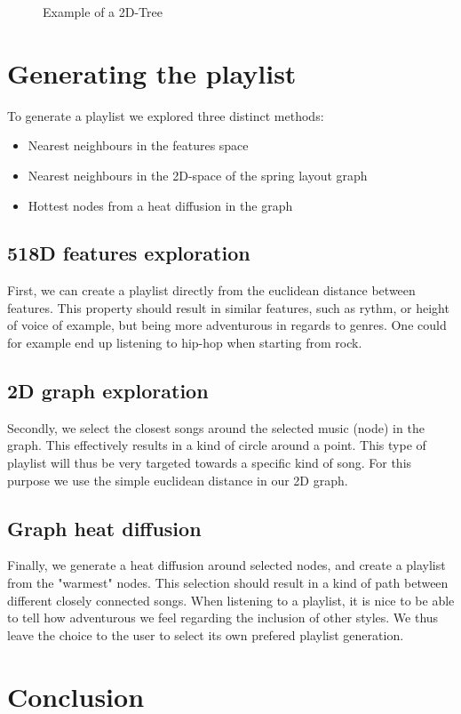 \begin{figure}[h!]
  \centering
  \caption{Example of a 2D-Tree}
  \label{fig:ex_tree}
\end{figure}

\section{Generating the playlist}

To generate a playlist we explored three distinct methods:
\begin{itemize}
\item Nearest neighbours in the features space
\item Nearest neighbours in the 2D-space of the spring layout graph 
\item Hottest nodes from a heat diffusion in the graph
\end{itemize}

\subsection{518D features exploration}
First, we can create a playlist directly from the euclidean distance between features. This property should result in similar features, such as rythm, or height of voice of example, but being more adventurous in regards to genres. One could for example end up listening to hip-hop when starting from rock.

\subsection{2D graph exploration}
Secondly, we select the closest songs around the selected music (node) in the graph. This effectively results in a kind of circle around a point. This type of playlist will thus be very targeted towards a specific kind of song. For this purpose we use the simple euclidean distance in our 2D graph.

\subsection{Graph heat diffusion}
Finally, we generate a heat diffusion around selected nodes, and create a playlist from the "warmest" nodes. This selection should result in a kind of path between different closely connected songs. 	
When listening to a playlist, it is nice to be able to tell how adventurous we feel regarding the inclusion of other styles. We thus leave the choice to the user to select its own prefered playlist generation.



\begin{figure}[h!]
  \centering
  \caption{}
  \label{fig:}
\end{figure}

\section{Conclusion}

